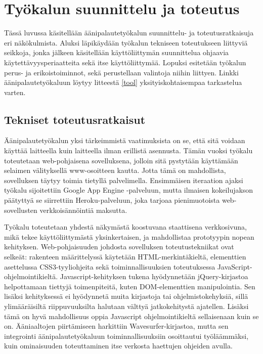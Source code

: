 \documentclass[utf8]{gradu3}
\begin{document}
\chapter{Työkalun suunnittelu ja toteutus}
\label{toteutus}

Tässä luvussa käsitellään äänipalautetyökalun suunnittelu- ja toteutusratkaisuja eri näkökulmista. Aluksi läpikäydään työkalun tekniseen toteutukseen liittyviä seikkoja, jonka jälkeen käsitellään käyttöliittymän suunnittelua ohjaavia käytettävyysperiaatteita sekä itse käyttöliittymää. Lopuksi esitetään työkalun perus- ja erikoistoiminnot, sekä perustellaan valintoja niihin liittyen. Linkki äänipalautetyökaluun löytyy litteestä \ref{tool} yksityiskohtaisempaa tarkastelua varten.

\section{Tekniset toteutusratkaisut}

Äänipalautetyökalun yksi tärkeimmistä vaatimuksista on se, että sitä voidaan käyttää laitteella kuin laitteella ilman erillistä asennusta. Tämän vuoksi työkalu toteutetaan web-pohjaisena sovelluksena, jolloin sitä pystytään käyttämään selaimen välityksellä www-osoitteen kautta. Jotta tämä on mahdollista, sovelluksen täytyy toimia tietyllä palvelimella. Ensimmäisen iteraation ajaksi työkalu sijoitettiin Google App Engine -palveluun, mutta ilmaisen kokeilujakson päätyttyä se siirrettiin Heroku-palveluun, joka tarjoaa pienimuotoista web-sovellusten verkkoisännöintiä maksutta. 

Työkalu toteutetaan yhdestä näkymästä koostuvana staattisena verkkosivuna, mikä tekee käyttöliittymästä yksinkertaisen, ja mahdollistaa prototyypin nopean kehityksen. Web-pohjaisuuden johdosta sovelluksen toteutustekniikat ovat selkeät: rakenteen määrittelyssä käytetään HTML-merkintäkieltä, elementtien asettelussa CSS3-tyyliohjeita sekä toiminnallisuuksien toteutuksessa JavaScript-ohjelmointikieltä. Javascript-kehityksen tukena hyödynnetään jQuery-kirjastoa helpottamaan tiettyjä toimenpiteitä, kuten DOM-elementtien manipulointia. Sen lisäksi kehityksessä ei hyödynnetä muita kirjastoja tai ohjelmistokehyksiä, sillä ylimääräisiltä riippuvuuksilta halutaan välttyä jatkokehitystä ajatellen. Lisäksi tämä on hyvä mahdollisuus oppia Javascript ohjelmointikieltä sellaisenaan kuin se on. Ääniaaltojen piirtämiseen harkittiin Wavesurfer-kirjastoa, mutta sen integrointi äänipalautetyökaluun toiminnallisuuksiin osoittautui työläämmäksi, kuin ominaisuuden toteuttaminen itse verkosta haettujen ohjeiden avulla.
\end{document}
